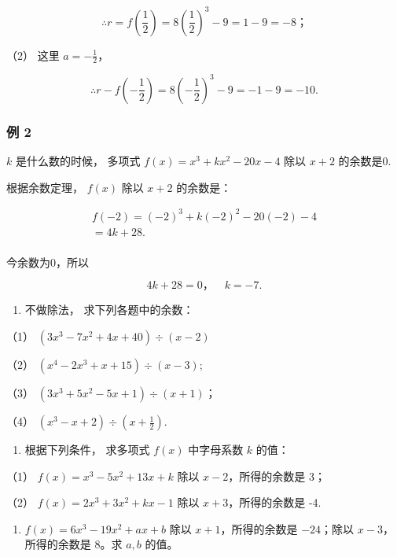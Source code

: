 \[
\therefore r = f \left(\frac {1}{2}\right) = 8 \left(\frac {1}{2}\right) ^ {3} - 9 = 1 - 9 = - 8\text{；}
\]

（2） 这里 \(a = -\frac{1}{2}\)，

\[
\therefore r - f \left(- \frac {1}{2}\right) = 8 \left(- \frac {1}{2}\right) ^ {3} - 9 = - 1 - 9 = - 10.
\]

\subsubsection{例 2}

\(k\) 是什么数的时候， 多项式 \(f(x) = x^{3} + kx^{2} - 20x - 4\) 除以
\(x + 2\) 的余数是0.

 根据余数定理， \(f(x)\) 除以 \(x + 2\) 的余数是：

\[
\begin{array}{l} f (- 2) = (- 2) ^ {3} + k (- 2) ^ {2} - 20 (- 2) - 4 \\ = 4 k + 28. \\ \end{array}
\]

今余数为0，所以

\[
4 k + 28 = 0\text{，} \quad k = - 7.
\]

\begin{enumerate}
\item
  不做除法， 求下列各题中的余数：
\end{enumerate}

（1） \((3x^{3} - 7x^{2} + 4x + 40)\div (x - 2)\)

（2） \((x^{4} - 2x^{3} + x + 15)\div (x - 3);\)

（3） \((3x^{3} + 5x^{2} - 5x + 1) \div (x + 1)\)；

（4） \((x^{3} - x + 2)\div \left(x + \frac{1}{2}\right).\)

\begin{enumerate}[start=2]
\item
  根据下列条件， 求多项式 \(f(x)\) 中字母系数 \(k\) 的值：
\end{enumerate}

（1） \(f(x) = x^3 - 5x^2 + 13x + k\) 除以 \(x - 2\)，所得的余数是 3；

（2） \(f(x) = 2x^{3} + 3x^{2} + kx - 1\) 除以 \(x + 3\)，所得的余数是
-4.

\begin{enumerate}[start=3]
\item
  \(f(x) = 6x^{3} - 19x^{2} + ax + b\) 除以 \(x + 1\)，所得的余数是
  \(-24\)；除以 \(x - 3\)，所得的余数是 8。求 \(a, b\) 的值。
\end{enumerate}

